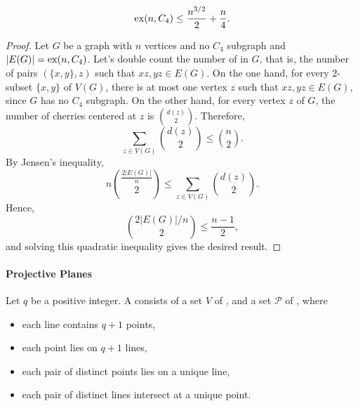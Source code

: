\begin{theorem}
    \begin{equation}
        \operatorname{ex}(n, C_4) \leq \frac{n^{3/2}}{2} + \frac{n}{4}.
    \end{equation}
\end{theorem}

\begin{proof}
    Let \(G\) be a graph with \(n\) vertices and no \(C_4\) subgraph
    and \(|E(G)| = \operatorname{ex}(n, C_4)\).
    Let's double count the number of  in \(G\),
    that is, the number of pairs \((\{x, y\}, z)\) such that \(xz, yz \in E(G)\).
    On the one hand, for every \(2\)-subset \(\{x, y\}\) of \(V(G)\),
    there is at most one vertex \(z\) such that \(xz, yz \in E(G)\),
    since \(G\) has no \(C_4\) subgraph.
    On the other hand, for every vertex \(z\) of \(G\),
    the number of cherries centered at \(z\) is \(\binom{d(z)}{2}\).
    Therefore, 
    \begin{equation}
        \sum_{z \in V(G)} \binom{d(z)}{2} \leq \binom{n}{2}.
    \end{equation}
    By Jensen's inequality,
    \begin{equation}
        n\binom{\frac{2|E(G)|}{n}}{2} \leq \sum_{z \in V(G)} \binom{d(z)}{2}.
    \end{equation}
    Hence,
    \begin{equation}
        \binom{2|E(G)|/n}{2} \leq \frac{n-1}{2},
    \end{equation}
    and solving this quadratic inequality gives the desired result.
\end{proof}

\paragraph{Projective Planes}

\begin{definition}
    Let \(q\) be a positive integer.
    A  consists of a set \(V\) of , and a set \(\mathcal{P}\) of ,
    where
    \begin{itemize}
        \item \label{def:projective-plane-1} each line contains \(q+1\) points,
        \item \label{def:projective-plane-2} each point lies on \(q+1\) lines,
        \item \label{def:projective-plane-3} each pair of distinct points lies on a unique line,
        \item \label{def:projective-plane-4} each pair of distinct lines intersect at a unique point.
    \end{itemize}
\end{definition}


